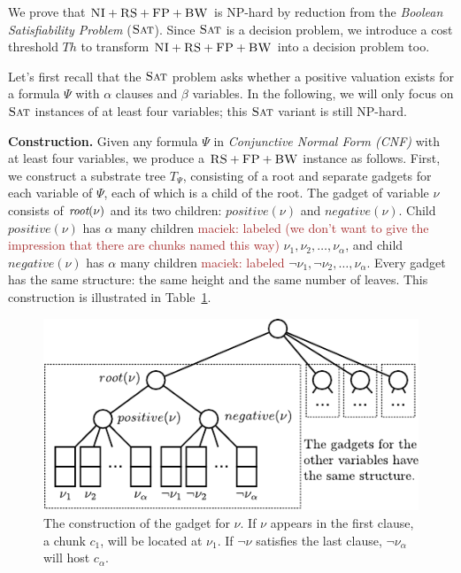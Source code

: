 \documentclass[9pt]{sigcomm-alternate}
\newcommand{\maciek}[1]{\textcolor{brown}{maciek: #1}}
\newcommand{\variab}{\nu}
\newcommand{\aroot}{\emph{root}}
\newcommand{\clauses}{\alpha}
\newcommand{\variables}{\beta}
\newcommand{\achunk}{\ensuremath{c}}
\newcommand{\CC}{\textsc{NI}}
\newcommand{\FP}{\textsc{FP}}
\newcommand{\RS}{\textsc{RS}}
\newcommand{\BW}{\textsc{BW}}
\newcommand{\Tree}{\ensuremath{T}}
\newcommand{\SAT}{\textsc{Sat}}
\newcommand{\Formula}{\ensuremath{\Psi}}
\newcommand{\Thr}{\ensuremath{Th}}
\newcommand{\positive}{\ensuremath{positive}}
\newcommand{\negative}{\ensuremath{negative}}
\begin{document}
\begin{appendix}

We prove that $\CC+\RS+\FP+\BW$ is NP-hard by reduction from the \emph{Boolean Satisfiability Problem} ($\SAT$).
Since $\SAT$ is a decision
problem, we 
introduce a cost threshold $\Thr$ to transform $\CC+\RS+\FP+\BW$ into a decision problem too.

Let's first recall that the $\SAT$ problem asks whether a positive valuation exists
for a formula $\Formula$ with $\clauses$ clauses and $\variables$ variables.
In the following, we will only focus on $\SAT$ instances of at least four variables;
this $\SAT$ variant is still NP-hard.

\textbf{Construction.}
Given any formula $\Formula$ in \emph{Conjunctive Normal Form (CNF)} with at least four variables, we produce
a $\RS+\FP+\BW$ instance as follows. First, we construct a substrate tree $\Tree_{\Formula}$, consisting of
a root and separate gadgets for each variable of $\Formula$, each of which
is a child of the root.
The gadget of variable $\variab$ consists of $\aroot(\variab)$ and its two children:
$\positive(\variab)$ and $\negative(\variab)$. Child $\positive(\variab)$ has $\clauses$
many children \maciek{labeled (we don't want to give the impression that there are chunks named this way)} $\nu_1, \nu_2, \ldots, \nu_{\clauses}$, and child
$\negative(\variab)$ has
$\clauses$ many children \maciek{labeled} $\neg \nu_1, \neg \nu_2, \dots, \nu_{\clauses}$. Every
gadget has the same structure: the same height and the same number of
leaves. This construction is illustrated in
Table~\ref{fig:construction_3sat}.


\begin{figure}
\includegraphics[width=\columnwidth]{figs/construction_3sat}
\caption{The construction of the gadget for $\nu$. If $\nu$ appears in the
first clause, a chunk $\achunk_1$, will be located at $\nu_1$. If $\neg \nu$
satisfies the last clause, $\neg
\nu_\alpha$ will host $\achunk_\alpha$.}
\label{fig:construction_3sat}
\end{figure}


\end{appendix}
\end{document}
